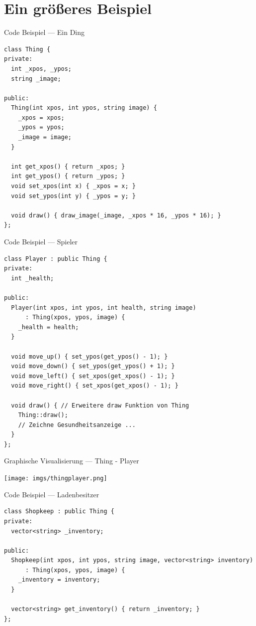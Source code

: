 \documentclass[presentation]{beamer}
\begin{document}
\section{Ein größeres Beispiel}
\label{sec:orgba4afcb}
\begin{frame}[label={sec:orgd191642},fragile]{Code Beispiel --- Ein Ding}
 \begin{verbatim}
class Thing {
private:
  int _xpos, _ypos;
  string _image;

public:
  Thing(int xpos, int ypos, string image) {
    _xpos = xpos;
    _ypos = ypos;
    _image = image;
  }

  int get_xpos() { return _xpos; }
  int get_ypos() { return _ypos; }
  void set_xpos(int x) { _xpos = x; }
  void set_ypos(int y) { _ypos = y; }

  void draw() { draw_image(_image, _xpos * 16, _ypos * 16); }
};
\end{verbatim}
\end{frame}
\begin{frame}[label={sec:org70200f9},fragile]{Code Beispiel --- Spieler}
 \begin{verbatim}
class Player : public Thing {
private:
  int _health;

public:
  Player(int xpos, int ypos, int health, string image)
      : Thing(xpos, ypos, image) {
    _health = health;
  }

  void move_up() { set_ypos(get_ypos() - 1); }
  void move_down() { set_ypos(get_ypos() + 1); }
  void move_left() { set_xpos(get_xpos() - 1); }
  void move_right() { set_xpos(get_xpos() - 1); }

  void draw() { // Erweitere draw Funktion von Thing
    Thing::draw();
    // Zeichne Gesundheitsanzeige ...
  }
};
\end{verbatim}
\end{frame}
\begin{frame}[label={sec:org2311f36}]{Graphische Visualisierung --- Thing - Player}
\begin{center}
\texttt{[image: imgs/thingplayer.png]}
\end{center}
\end{frame}
\begin{frame}[label={sec:orga990902},fragile]{Code Beispiel --- Ladenbesitzer}
 \begin{verbatim}
class Shopkeep : public Thing {
private:
  vector<string> _inventory;

public:
  Shopkeep(int xpos, int ypos, string image, vector<string> inventory)
      : Thing(xpos, ypos, image) {
    _inventory = inventory;
  }

  vector<string> get_inventory() { return _inventory; }
};
\end{verbatim}
\end{frame}
\end{document}
